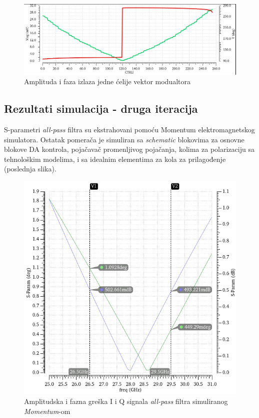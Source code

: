 \documentclass[journal,twocolumn,letterpaper]{IEEEJERM}
\begin{document}
\begin{figure}[!htbp]
  \centering
  \includegraphics[width=\linewidth]{vga_linearity.png}
  \caption{Amplituda i faza izlaza jedne ćelije vektor modualtora}
  \label{fig:vga_linearity}
\end{figure}

\newpage

\subsection{Rezultati simulacija - druga iteracija}

S-parametri \textit{all-pass} filtra su ekstrahovani pomoću Momentum elektromagnetskog simulatora. Ostatak pomerača je simuliran sa \textit{schematic} blokovima za osnovne blokove DA kontrola, pojačavač promenljivog pojačanja, kolima za polarizaciju sa tehnološkim modelima, i sa idealnim elementima za kola za prilagođenje (poslednja slika).


\begin{figure}[!htbp]
  \centering
  \includegraphics[width=\linewidth]{mag_phase_error_mom@28GHz.png}
  \caption{Amplitudska i fazna greška I i Q signala \textit{all-pass} filtra simuliranog \textit{Momentum}-om}
  \label{fig:mag_phase_error_mom@28GHz}
\end{figure}
\end{document}
